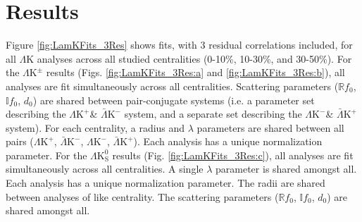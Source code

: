 \documentclass[ALICE,manyauthors]{cernphprep}
\newcommand{\LamK}{$\Lambda$K\xspace}
\newcommand{\LamKchP}{$\Lambda\mathrm{K^{+}}$\xspace}
\newcommand{\ALamKchM}{$\bar{\Lambda}\mathrm{K^{-}}$\xspace}
\newcommand{\LamKchM}{$\Lambda\mathrm{K^{-}}$\xspace}
\newcommand{\ALamKchP}{$\bar{\Lambda}\mathrm{K^{+}}$\xspace}
\newcommand{\LamKpm}{$\Lambda\mathrm{K^{\pm}}$\xspace}
\newcommand{\LamKs}{$\Lambda\mathrm{K^{0}_{S}}$\xspace}
\begin{document}
\clearpage
\section{Results}
\label{sec:Results}

Figure \ref{fig:LamKFits_3Res} shows fits, with 3 residual correlations included, for all \LamK analyses across all studied centralities (0-10\%, 10-30\%, and 30-50\%). 
For the \LamKpm results (Figs. \ref{fig:LamKFits_3Res:a} and \ref{fig:LamKFits_3Res:b}), all analyses are fit simultaneously across all centralities.
Scattering parameters ($\mathbb{R}f_{0}$, $\mathbb{I}f_{0}$, $d_{0}$) are shared between pair-conjugate systems (i.e. a parameter set describing the \LamKchP \& \ALamKchM system, and a separate set describing the \LamKchM \& \ALamKchP system).
For each centrality, a radius and $\lambda$ parameters are shared between all pairs (\LamKchP, \ALamKchM, \LamKchM, \ALamKchP).
Each analysis has a unique normalization parameter.
For the \LamKs results (Fig. \ref{fig:LamKFits_3Res:c}), all analyses are fit simultaneously across all centralities.
A single $\lambda$ parameter is shared amongst all.
Each analysis has a unique normalization parameter.
The radii are shared between analyses of like centrality.
The scattering parameters ($\mathbb{R}f_{0}$, $\mathbb{I}f_{0}$, $d_{0}$) are shared amongst all.
\end{document}
